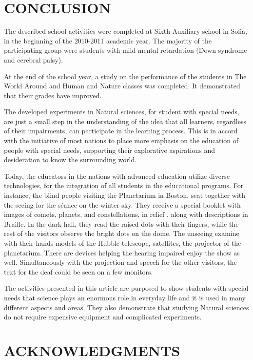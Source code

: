 \documentclass[11.5pt]{sig-alternate} %
\begin{document}
\begin{large}
\section*{CONCLUSION}

The described school activities were completed at Sixth Auxiliary school in Sofia, in the beginning of the 2010-2011 academic year. The majority of the participating group were students with mild mental retardation (Down syndrome and cerebral palsy).

At the end of the school year, a study on the performance of the students in The World Around and Human and Nature classes was completed. It demonstrated that their grades have improved.

The developed experiments in Natural sciences, for student with special needs, are just a small step in the understanding of the idea that all learners, regardless of their impairments, can participate in the learning process. This is in accord with the initiative of most nations to place more emphasis on the education of people with special needs, supporting their explorative aspirations and desideration to know the surrounding world.

Today, the educators in the nations with advanced education utilize diverse technologies, for the integration of all students in the educational programs. For instance, the blind people visiting the Planetarium in Boston, seat together with the seeing for the séance on the winter sky. They receive a special booklet with images of comets, planets, and constellations, in relief , along with descriptions in Braille. In the dark hall, they read the raised dots with their fingers, while the rest of the visitors observe the bright dots on the dome. The unseeing examine with their hands models of the Hubble telescope, satellites, the projector of the planetarium. There are devices helping the hearing impaired enjoy the show as well. Simultaneously with the projection and speech for the other visitors, the text for the deaf could be seen on a few monitors.

The activities presented in this article are purposed to show students with special needs that science plays an enormous role in everyday life and it is used in many different aspects and areas. They also demonstrate that studying Natural sciences do not require expensive equipment and complicated experiments. 

\section*{ACKNOWLEDGMENTS}


\end{large}
\end{document}
